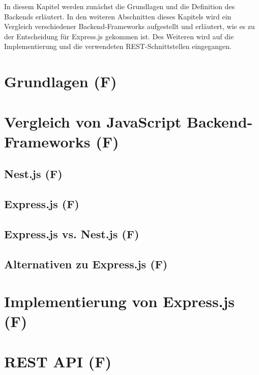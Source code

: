 In diesem Kapitel werden zunächst die Grundlagen und die Definition des Backends erläutert. In den weiteren Abschnitten dieses Kapitels wird ein Vergleich verschiedener Backend-Frameworks aufgestellt und erläutert, wie es zu der Entscheidung für Express.js gekommen ist. Des Weiteren wird auf die Implementierung und die verwendeten REST-Schnittstellen eingegangen.

\section{Grundlagen (F)}


\section{Vergleich von JavaScript Backend-Frameworks (F)}


\subsection{Nest.js (F)}


\subsection{Express.js (F)}


\subsection{Express.js vs. Nest.js (F)}


\subsection{Alternativen zu Express.js (F)}

\newpage
\section{Implementierung von Express.js (F)}


\section{REST API (F)}



